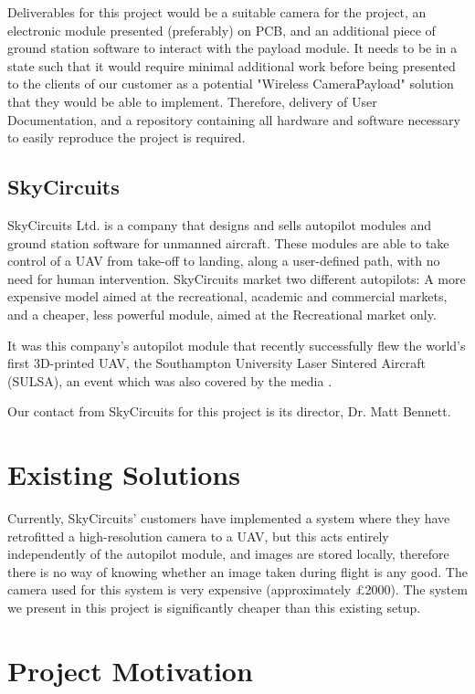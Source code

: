 Deliverables for this project would be a suitable camera for the project, an electronic module presented (preferably) on PCB, and an additional piece of ground station software to interact with the payload module. It needs to be in a state such that it would require minimal additional work before being presented to the clients of our customer as a potential "Wireless CameraPayload" solution that they would be able to implement. Therefore, delivery of User Documentation, and a repository containing all hardware and software necessary to easily reproduce the project is required.

\subsection{SkyCircuits}

SkyCircuits Ltd. \cite{SkyCircuits} is a company that designs and sells autopilot modules and ground station software for unmanned aircraft. These modules are able to take control of a UAV from take-off to landing, along a user-defined path, with no need for human intervention. SkyCircuits market two different autopilots: A more expensive model aimed at the recreational, academic and commercial markets, and a cheaper, less powerful module, aimed at the Recreational market only.

It was this company's autopilot module that recently successfully flew the world's first 3D-printed UAV, the Southampton University Laser Sintered Aircraft (SULSA), \cite{SULSA} an event which was also covered by the media \cite{SC_Press}.

Our contact from SkyCircuits for this project is its director, Dr. Matt Bennett.

\section{Existing Solutions}
\label{sec:existing_soln}

Currently, SkyCircuits' customers have implemented a system where they have retrofitted a high-resolution camera to a UAV, but this acts entirely independently of the autopilot module, and images are stored locally, therefore there is no way of knowing whether an image taken during flight is any good. The camera used for this system is very expensive (approximately \pounds 2000). The system we present in this project is significantly cheaper than this existing setup.

\section{Project Motivation}

